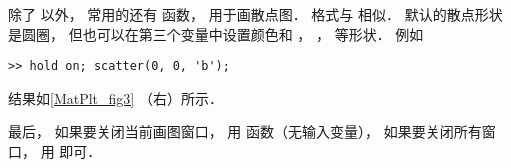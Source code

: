 除了  以外， 常用的还有  函数， 用于画散点图． 格式与  相似． 默认的散点形状是圆圈， 但也可以在第三个变量中设置颜色和 ， ，  等形状． 例如
\begin{lstlisting}[language=MatlabCom]
>> hold on; scatter(0, 0, 'b');
\end{lstlisting}
结果如\autoref{MatPlt_fig3} （右）所示．

最后， 如果要关闭当前画图窗口， 用  函数（无输入变量）， 如果要关闭所有窗口， 用  即可．